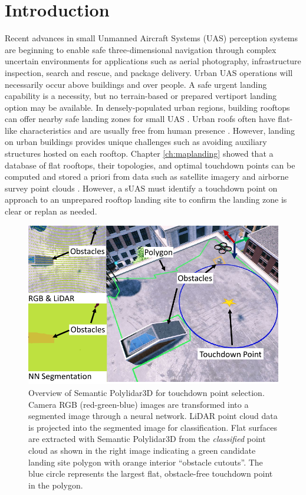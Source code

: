 \section{Introduction}

Recent advances in small Unmanned Aircraft Systems (UAS) perception systems are beginning to enable safe three-dimensional navigation through complex uncertain environments for applications such as aerial photography, infrastructure inspection, search and rescue, and package delivery. Urban UAS operations will necessarily occur above buildings and over people. A safe urgent landing capability is a necessity, but no terrain-based or prepared vertiport landing option \cite{patterson_timely_2014, atkins_emergency_2006, di_donato_evaluating_2017} may be available.  In densely-populated urban regions, building rooftops can offer nearby safe landing zones for small UAS \cite{desaraju_vision-based_2015}. Urban roofs often have flat-like characteristics and are usually free from human presence \cite{castagno_roof_2018}. However, landing on urban buildings provides unique challenges such as avoiding auxiliary structures hosted on each rooftop.  Chapter \ref{ch:maplanding} showed that a database of flat rooftops, their topologies, and optimal touchdown points can be computed and stored a priori from data such as satellite imagery and airborne survey point clouds \cite{castagno_map-based_2021}. However, a sUAS must identify a touchdown point on approach to an unprepared rooftop landing site to confirm the landing zone is clear or replan as needed.

\begin{figure}[!ht]
    \centering
    \includegraphics[width=0.70\columnwidth]{chapter_6_landingsim/figs/main_photo.pdf}
    \caption[Overview of Semantic Polylidar3D for touchdown point selection]{Overview of Semantic Polylidar3D for touchdown point selection. Camera RGB (red-green-blue) images are transformed into a segmented image through a neural network. LiDAR point cloud data is projected into the segmented image for classification. Flat surfaces are extracted with Semantic Polylidar3D from the \textit{classified} point cloud as shown in the right image indicating a green candidate landing site polygon with orange interior ``obstacle cutouts''. The blue circle represents the largest flat, obstacle-free touchdown point in the polygon.}
    \label{fig:ch6_ls_overview}
\end{figure}

